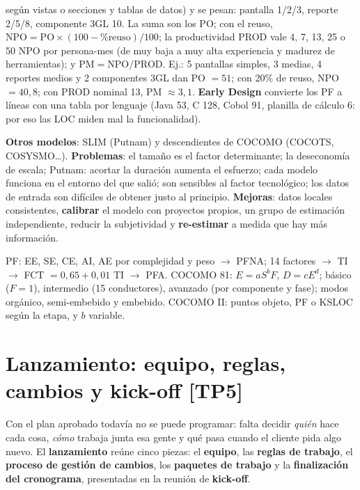 \documentclass[11pt,a4paper]{article}
\begin{document}
según vistas o secciones y tablas de datos) y se pesan: pantalla 1/2/3, reporte 2/5/8, componente 3GL 10. La
suma son los PO; con el reuso, $\text{NPO} = \text{PO} \times (100 - \%\text{reuso})/100$; la productividad
PROD vale 4, 7, 13, 25 o 50 NPO por persona-mes (de muy baja a muy alta experiencia y madurez de herramientas);
y $\text{PM} = \text{NPO}/\text{PROD}$. Ej.: 5 pantallas simples, 3 medias, 4 reportes medios y 2 componentes
3GL dan PO $= 51$; con 20\% de reuso, NPO $= 40{,}8$; con PROD nominal 13, PM $\approx 3{,}1$. \textbf{Early
Design} convierte los PF a líneas con una tabla por lenguaje (Java 53, C 128, Cobol 91, planilla de cálculo 6:
por eso las LOC miden mal la funcionalidad).

\textbf{Otros modelos}: SLIM (Putnam) y descendientes de COCOMO (COCOTS, COSYSMO\ldots). \textbf{Problemas}:
el tamaño es el factor determinante; la deseconomía de escala; Putnam: acortar la duración aumenta el esfuerzo;
cada modelo funciona en el entorno del que salió; son sensibles al factor tecnológico; los datos de entrada son
difíciles de obtener justo al principio. \textbf{Mejoras}: datos locales consistentes, \textbf{calibrar} el
modelo con proyectos propios, un grupo de estimación independiente, reducir la subjetividad y
\textbf{re-estimar} a medida que hay más información.

\begin{enresumen}
PF: EE, SE, CE, AI, AE por complejidad y peso $\to$ PFNA; 14 factores $\to$ TI $\to$ FCT $= 0{,}65 + 0{,}01$ TI
$\to$ PFA. COCOMO 81: $E = aS^bF$, $D = cE^d$; básico ($F = 1$), intermedio (15 conductores), avanzado (por
componente y fase); modos orgánico, semi-embebido y embebido. COCOMO II: puntos objeto, PF o KSLOC según la
etapa, y $b$ variable.
\end{enresumen}

\section[Lanzamiento: equipo, reglas, cambios y kick-off]{Lanzamiento: equipo, reglas, cambios y kick-off \hfill {\normalsize [TP5]}}
Con el plan aprobado todavía no se puede programar: falta decidir \emph{quién} hace cada cosa, \emph{cómo}
trabaja junta esa gente y qué pasa cuando el cliente pida algo nuevo. El \textbf{lanzamiento} reúne cinco
piezas: el \textbf{equipo}, las \textbf{reglas de trabajo}, el \textbf{proceso de gestión de cambios}, los
\textbf{paquetes de trabajo} y la \textbf{finalización del cronograma}, presentadas en la reunión de
\textbf{kick-off}.
\end{document}
